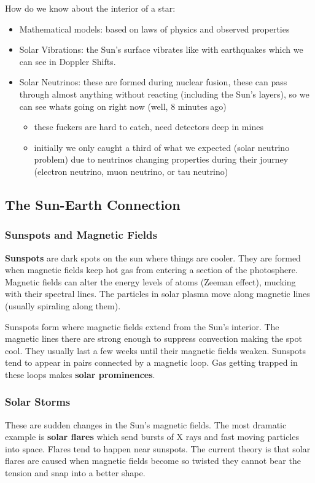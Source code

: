 How do we know about the interior of a star:
\begin{itemize}
\item Mathematical models: based on laws of physics and observed properties
\item Solar Vibrations: the Sun's surface vibrates like with earthquakes which we can see in Doppler Shifts.
\item Solar Neutrinos: these are formed during nuclear fusion, these can pass through almost anything without reacting (including the Sun's layers), so we can see whats going on right now (well, 8 minutes ago)
\begin{itemize}
\item these fuckers are hard to catch, need detectors deep in mines
\item initially we only caught a third of what we expected (solar neutrino problem) due to neutrinos changing properties during their journey (electron neutrino, muon neutrino, or tau neutrino)
\end{itemize}
\end{itemize}

\subsection{The Sun-Earth Connection}
\subsubsection{Sunspots and Magnetic Fields}
\textbf{Sunspots} are dark spots on the sun where things are cooler. They are formed when magnetic fields keep hot gas from entering a section of the photosphere. Magnetic fields can alter the energy levels of atoms (Zeeman effect), mucking with their spectral lines. The particles in solar plasma move along magnetic lines (usually spiraling along them).

Sunspots form where magnetic fields extend from the Sun's interior. The magnetic lines there are strong enough to suppress convection making the spot cool. They usually last a few weeks until their magnetic fields weaken. Sunspots tend to appear in pairs connected by a magnetic loop. Gas getting trapped in these loops makes \textbf{solar prominences}.

\subsubsection{Solar Storms}
These are sudden changes in the Sun's magnetic fields. The most dramatic example is \textbf{solar flares} which send bursts of X rays and fast moving particles into space. Flares tend to happen near sunspots. The current theory is that solar flares are caused when magnetic fields become so twisted they cannot bear the tension and snap into a better shape.

